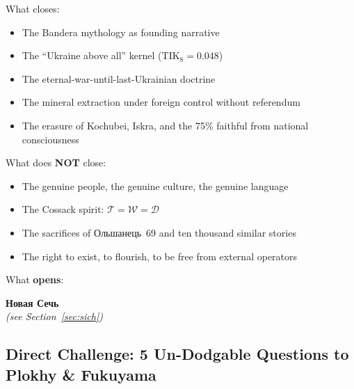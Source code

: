 \documentclass[11pt,a4paper]{article}
\theoremstyle{definition}
\theoremstyle{remark}
\newcommand{\TIKeight}{\text{TIK}_8}
\newcommand{\Thought}{\mathcal{T}}
\newcommand{\Word}{\mathcal{W}}
\newcommand{\Deed}{\mathcal{D}}
\begin{document}
\noindent What closes:
\begin{itemize}[noitemsep]
  \item The Bandera mythology as founding narrative
  \item The ``Ukraine above all'' kernel ($\TIKeight = 0.048$)
  \item The eternal-war-until-last-Ukrainian doctrine
  \item The mineral extraction under foreign control without referendum
  \item The erasure of Kochubei, Iskra, and the 75\% faithful
    from national consciousness
\end{itemize}

\noindent What does \textbf{NOT} close:
\begin{itemize}[noitemsep]
  \item The genuine people, the genuine culture, the genuine language
  \item The Cossack spirit: $\Thought = \Word = \Deed$
  \item The sacrifices of Ольшанець~69 and ten thousand similar stories
  \item The right to exist, to flourish, to be free from external operators
\end{itemize}

\noindent What \textbf{opens}:
\begin{center}
  {\large\color{sichblue}\textbf{\foreignlanguage{russian}{Новая Сечь}}}\\
  \textit{(see Section~\ref{sec:sich})}
\end{center}

\subsection{Direct Challenge: 5 Un-Dodgable Questions
  to Plokhy \& Fukuyama}
\label{sec:plokhy-questions}
\end{document}
